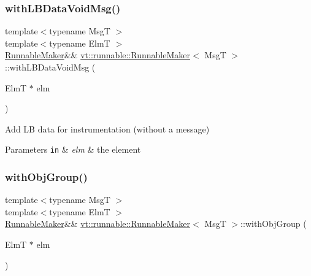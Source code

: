 \subsubsection{\texorpdfstring{with\+L\+B\+Data\+Void\+Msg()}{withLBDataVoidMsg()}}
{\footnotesize\ttfamily template$<$typename MsgT $>$ \\
template$<$typename ElmT $>$ \\
\hyperlink{structvt_1_1runnable_1_1_runnable_maker}{Runnable\+Maker}\&\& \hyperlink{structvt_1_1runnable_1_1_runnable_maker}{vt\+::runnable\+::\+Runnable\+Maker}$<$ MsgT $>$\+::with\+L\+B\+Data\+Void\+Msg (\begin{DoxyParamCaption}\item[{ElmT $\ast$}]{elm }\end{DoxyParamCaption})\hspace{0.3cm}{\ttfamily [inline]}}



Add LB data for instrumentation (without a message) 


\begin{DoxyParams}[1]{Parameters}
\mbox{\tt in}  & {\em elm} & the element \\
\hline
\end{DoxyParams}
\mbox{\label{structvt_1_1runnable_1_1_runnable_maker_acc0749541ac045169d28e5748dc7d1ed}} 
\subsubsection{\texorpdfstring{with\+Obj\+Group()}{withObjGroup()}}
{\footnotesize\ttfamily template$<$typename MsgT $>$ \\
template$<$typename ElmT $>$ \\
\hyperlink{structvt_1_1runnable_1_1_runnable_maker}{Runnable\+Maker}\&\& \hyperlink{structvt_1_1runnable_1_1_runnable_maker}{vt\+::runnable\+::\+Runnable\+Maker}$<$ MsgT $>$\+::with\+Obj\+Group (\begin{DoxyParamCaption}\item[{ElmT $\ast$}]{elm }\end{DoxyParamCaption})\hspace{0.3cm}{\ttfamily [inline]}}



